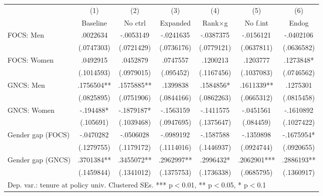 \begin{adjustbox}{max width=\textwidth}
\begin{tabular}{lcccccc}
\toprule
 & (1) & (2) & (3) & (4) & (5) & (6) \\
 & Baseline & No ctrl & Expanded & Rank$\times$g & No f.int & Endog \\
\midrule
FOCS: Men & .0022634 & -.0053149 & -.0241635 & -.0387375 & -.0156121 & -.0402106 \\
 & (.0747303) & (.0721429) & (.0736176) & (.0779121) & (.0637811) & (.0636582) \\[0.3em]
FOCS: Women & .0492915 & .0452879 & .0747557 & .1200213 & .1203777 & .1273848* \\
 & (.1014593) & (.0979015) & (.095452) & (.1167456) & (.1037083) & (.0746562) \\[0.3em]
GNCS: Men & .1756504** & .1575885** & .1399838 & .1584856* & .1611339** & .1275301 \\
 & (.0825895) & (.0751906) & (.0844166) & (.0862263) & (.0665312) & (.0815458) \\[0.3em]
GNCS: Women & -.194488* & -.1879187* & -.1563159 & -.1411575 & -.0451561 & -.1610892 \\
 & (.105691) & (.1039468) & (.0947695) & (.1375647) & (.084459) & (.1027422) \\[0.3em]
Gender gap (FOCS) & -.0470282 & -.0506028 & -.0989192 & -.1587588 & -.1359898 & -.1675954* \\
 & (.1279755) & (.1179172) & (.1114016) & (.1446937) & (.0924744) & (.0920655) \\[0.3em]
Gender gap (GNCS) & .3701384** & .3455072** & .2962997** & .2996432* & .2062901*** & .2886193** \\
 & (.1459844) & (.1341012) & (.1375753) & (.1736338) & (.0685795) & (.1360917) \\[0.3em]
\bottomrule
\multicolumn{7}{l}{\footnotesize Dep. var.: tenure at policy univ. Clustered SEs. *** p$<$0.01, ** p$<$0.05, * p$<$0.1} \\
\end{tabular}
\end{adjustbox}
